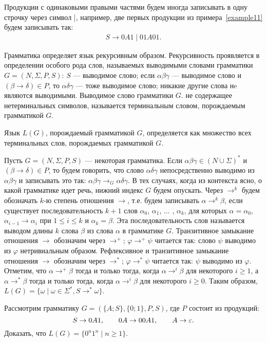 Продукции с одинаковыми правыми частями будем иногда записывать в одну строчку через символ |, например, две первых продукции из примера~\ref{example11} будем записывать так:
\begin{equation}
\begin{array}{l}
	S \to 0A1 \mid 01A01.
\end{array}
\end{equation}

Грамматика определяет язык рекурсивным образом. Рекурсивность проявляется в определении особого рода слов, называемых выводимыми словами грамматики $G=(N,\Sigma,P,S)$: $S$ --- выводимое слово; если $\alpha\beta\gamma$ --- выводимое слово и $(\beta\to\delta)\in P$, то $\alpha\delta\gamma$ --- тоже выводимое слово; никакие другие слова нe являются выводимыми. Выводимое слово грамматики $G$. не содержащее нетерминальных символов, называется терминальным словом, порождаемым грамматикой $G$.

Язык $L(G)$, порождаемый грамматикой $G$, определяется как множество всех терминальных слов, порождаемых грамматикой $G$.

Пусть $G=(N,\Sigma,P,S)$ --- некоторая грамматика. Если $\alpha\beta\gamma\in(N\cup\Sigma)^*$ и $(\beta\to\delta)\in P$, то будем говорить, что слово $\alpha\delta\gamma$ непосредственно выводимо из $\alpha\beta\gamma$ и записывать это так: $\alpha\beta\gamma\to_G\alpha\delta\gamma$. В тех случаях, когда из контекста ясно, о какой грамматике идет речь, нижний индекс $G$ будем опускать. Через $\to^k$ будем обозначать $k$-ю степень отношения $\to$, т.е. будем записывать $\alpha\to^k\beta$, если существует последовательность $k+1$ слов $\alpha_0$, $\alpha_1$, $\ldots$ , $\alpha_k$, для которых $\alpha=\alpha_0$, $\alpha_{i-1}\to\alpha_i$ при $1\le i\le k$ и $\alpha_k=\beta$. Эта последовательность слов называется выводом длины $k$ слова $\beta$ из слова $\alpha$ в грамматике $G$. Транзитивное замыкание отношения $\to$ обозначим через $\to^+$; $\varphi\to^+\psi$  читается так: слово $\psi$ выводимо из $\varphi$ нетривиальным образом. Рефлексивное и транзитивное замыкание отношения $\to$ обозначим через $\to^*$; $\varphi\to^*\psi$ читается так: $\psi$ выводимо из $\varphi$. Отметим, что $\alpha\to^+\beta$ тогда и только тогда, когда $\alpha\to^i\beta$ для некоторого $i\ge 1$, а $\alpha\to^*\beta$ тогда и только тогда, когда $\alpha\to^i\beta$ для некоторого $i\ge 0$.
Таким образом, $L(G) = \{\omega\mid\omega\in\Sigma^*, S\to^*\omega\}$.

\begin{myproblem}
Рассмотрим грамматику $G=(\{A;S\},\{0;1\},P,S)$, где $P$ состоит из продукций:
\[
    S  \to 0A1,\qquad
    0A \to 00A1,\qquad
    A  \to \varepsilon.
\]
Доказать, что $L(G)=\{0^n1^n\mid n\ge 1\}$.
\end{myproblem}

